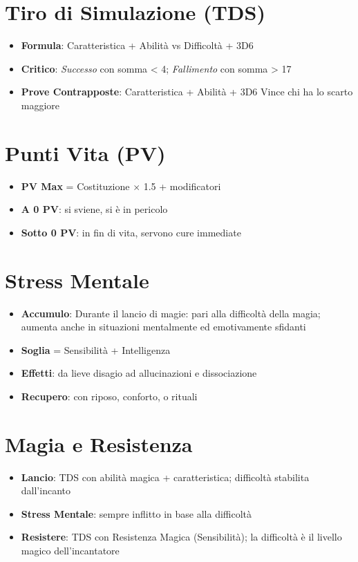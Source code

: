 \documentclass[../manuale_main.tex]{subfiles}
\begin{document}
\section*{Tiro di Simulazione (TDS)}
\begin{itemize}
  \item \textbf{Formula}: Caratteristica + Abilit\`a vs Difficolt\`a + 3D6
  \item \textbf{Critico}: \emph{Successo} con somma < 4; \emph{Fallimento} con somma > 17
  \item \textbf{Prove Contrapposte}: Caratteristica + Abilit\`a + 3D6 \rightarrow Vince chi ha lo scarto maggiore
\end{itemize}

\section*{Punti Vita (PV)}
\begin{itemize}
  \item \textbf{PV Max} = Costituzione $\times$ 1.5 + modificatori
  \item \textbf{A 0 PV}: si sviene, si \`e in pericolo
  \item \textbf{Sotto 0 PV}: in fin di vita, servono cure immediate
\end{itemize}

\section*{Stress Mentale}
\begin{itemize}
  \item \textbf{Accumulo}: Durante il lancio di magie: pari alla difficolt\`a della magia; aumenta anche in situazioni mentalmente ed emotivamente sfidanti
  \item \textbf{Soglia} = Sensibilit\`a + Intelligenza
  \item \textbf{Effetti}: da lieve disagio ad allucinazioni e dissociazione
  \item \textbf{Recupero}: con riposo, conforto, o rituali
\end{itemize}

\section*{Magia e Resistenza}
\begin{itemize}
  \item \textbf{Lancio}: TDS con abilità magica + caratteristica; difficoltà stabilita dall'incanto
  \item \textbf{Stress Mentale}: sempre inflitto in base alla difficolt\`a
  \item \textbf{Resistere}: TDS con Resistenza Magica (Sensibilit\`a); la difficolt\`a \`e il livello magico dell'incantatore
\end{itemize}
\end{document}
